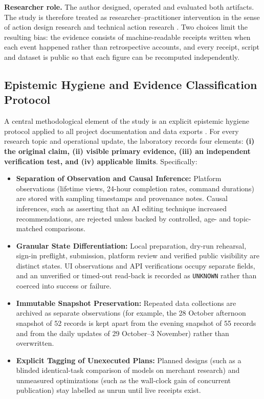 \documentclass[11pt,a4paper]{article}
\theoremstyle{definition}
\begin{document}
\textbf{Researcher role.} The author designed, operated and evaluated both artifacts. The study is therefore treated as researcher--practitioner intervention in the sense of action design research \citep{Sein2011} and technical action research \citep{Wieringa2014}. Two choices limit the resulting bias: the evidence consists of machine-readable receipts written when each event happened rather than retrospective accounts, and every receipt, script and dataset is public so that each figure can be recomputed independently.

\subsection{Epistemic Hygiene and Evidence Classification Protocol}
\label{sec:3.2}

A central methodological element of the study is an explicit epistemic hygiene protocol applied to all project documentation and data exports \citep{Runeson2009}. For every research topic and operational update, the laboratory records four elements: \textbf{(i) the original claim, (ii) visible primary evidence, (iii) an independent verification test, and (iv) applicable limits}. Specifically:

\begin{itemize}[leftmargin=1.8em]
    \item \textbf{Separation of Observation and Causal Inference:} Platform observations (lifetime views, 24-hour completion rates, command durations) are stored with sampling timestamps and provenance notes. Causal inferences, such as asserting that an AI editing technique increased recommendations, are rejected unless backed by controlled, age- and topic-matched comparisons.
    \item \textbf{Granular State Differentiation:} Local preparation, dry-run rehearsal, sign-in preflight, submission, platform review and verified public visibility are distinct states. UI observations and API verifications occupy separate fields, and an unverified or timed-out read-back is recorded as \texttt{UNKNOWN} rather than coerced into success or failure.
    \item \textbf{Immutable Snapshot Preservation:} Repeated data collections are archived as separate observations (for example, the 28 October afternoon snapshot of 52 records is kept apart from the evening snapshot of 55 records and from the daily updates of 29 October--3 November) rather than overwritten.
    \item \textbf{Explicit Tagging of Unexecuted Plans:} Planned designs (such as a blinded identical-task comparison of models on merchant research) and unmeasured optimizations (such as the wall-clock gain of concurrent publication) stay labelled as unrun until live receipts exist.
\end{itemize}
\end{document}
